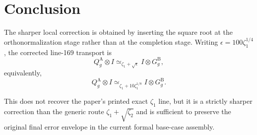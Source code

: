 \documentclass[11pt]{article}
\begin{document}
\section{Conclusion}

The sharper local correction is obtained by inserting the square root at the
orthonormalization stage rather than at the completion stage.  Writing
\(
\epsilon = 100\zeta_1^{1/4}
\), the corrected line-169 transport is
\[
  Q^{\mathrm A}_g \otimes I
  \simeq_{\zeta_1 + \sqrt{\epsilon}}
  I \otimes G^{\mathrm B}_g,
\]
equivalently,
\[
  Q^{\mathrm A}_g \otimes I
  \simeq_{\zeta_1 + 10\zeta_1^{1/8}}
  I \otimes G^{\mathrm B}_g.
\]

This does not recover the paper's printed exact $\zeta_1$ line, but it is a
strictly sharper correction than the generic route
$\zeta_1 + \sqrt{\zeta_2}$ and is sufficient to preserve the original final
error envelope in the current formal base-case assembly.



\end{document}
